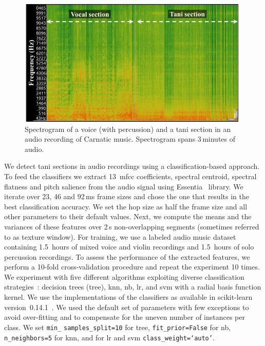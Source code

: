 {\begin{figure}
	\begin{center}
		\includegraphics[width=\figSizeEighty]{ch05_preprocessing/figures/spectrogramTani.png}
	\end{center}
	\caption[Illustration of spectrogram a vocal and a \gls{tani} section]{Spectrogram of a voice (with percussion) and a \gls{tani} section in an audio recording of Carnatic music. Spectrogram spans 3\,minutes of audio.}
	\label{fig:spectrogram_of_tani_segment}
\end{figure}

We detect \gls{tani} sections in audio recordings using a classification-based approach. To feed the classifiers we extract 13~\acrshort{mfcc} coefficients, spectral centroid, spectral flatness and pitch salience from the audio signal using Essentia~\citep{essentia} library. We iterate over 23, 46 and 92\,ms frame sizes and chose the one that results in the best classification accuracy. We set the hop size as half the frame size and all other parameters to their default values. Next, we compute the means and the variances of these features over 2\,s non-overlapping segments (sometimes referred to as texture window). For training, we use a labeled audio music dataset containing 1.5~hours of mixed voice and violin recordings and 1.5~hours of solo percussion recordings. To assess the performance of the extracted features, we perform a 10-fold cross-validation procedure and repeat the experiment 10 times. We experiment with five different algorithms exploiting diverse classification strategies~\citep{Hastie09BOOK}: decision trees (\acrshort{tree}), \gls{knn}, \gls{nb}, \gls{lr}, and \gls{svm} with a radial basis function kernel. We use the implementations of the classifiers as available in scikit-learn version~0.14.1~\citep{scikitlearn}. We used the default set of parameters with few exceptions to avoid over-fitting and to compensate for the uneven number of instances per class. We set \texttt{min\_} \texttt{samples\_split=10} for \acrshort{tree}, \texttt{fit\_prior=False} for \gls{nb}, \texttt{n\_neighbors=5} for \gls{knn}, and for \gls{lr} and \gls{svm} \texttt{class\_weight=`auto'}. 

}
